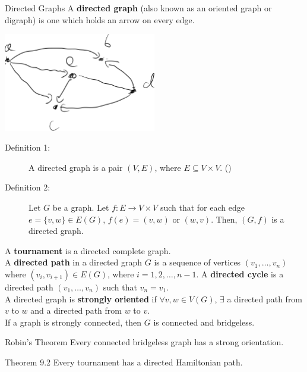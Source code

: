 \documentclass[10pt]{extarticle}
\begin{document}
  \begin{problem}{Directed Graphs}
    A \textbf{directed graph} (also known as an oriented graph or digraph) is one which holds an arrow on every edge.
    \begin{center}
      \includegraphics[width=0.5\textwidth]{images/digraph.png}
    \end{center}
    \begin{description}
      \item[Definition 1:] A directed graph is a pair $(V,E)$, where $E\subseteq V\times V$. (\textasteriskcentered)
      \item[Definition 2:] Let $G$ be a graph. Let $f: E \rightarrow V\times V$ such that for each edge $e = \{v,w\}\in E(G)$, $f(e) = (v,w)$ or $(w,v)$. Then, $(G,f)$ is a directed graph.
    \end{description}
    A \textbf{tournament} is a directed complete graph.\\

    A \textbf{directed path} in a directed graph $G$ is a sequence of vertices $(v_1,\dots,v_n)$ where $(v_i,v_{i+1})\in E(G)$, where $i = 1,2,\dots,n-1$. A \textbf{directed cycle} is a directed path $(v_1,\dots,v_n)$ such that $v_n = v_1$.\\

    A directed graph is \textbf{strongly oriented} if $\forall v,w\in V(G)$, $\exists$ a directed path from $v$ to $w$ and a directed path from $w$ to $v$.\\

    If a graph is strongly connected, then $G$ is connected and bridgeless. 
  \end{problem}
  \begin{problem}{Robin's Theorem}
    Every connected bridgeless graph has a strong orientation.
  \end{problem}
  \begin{problem}{Theorem 9.2}
    Every tournament has a directed Hamiltonian path.
  \end{problem}
\end{document}
